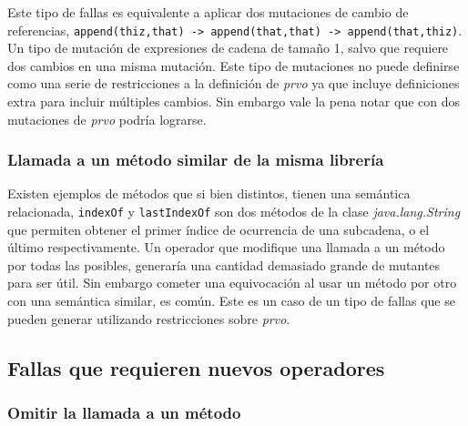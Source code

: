 Este tipo de fallas es equivalente a aplicar dos mutaciones de cambio de referencias, \lstinline|append(thiz,that) -> append(that,that) -> append(that,thiz)|. Un tipo de mutaci\'on de expresiones de cadena de tama\~no 1, salvo que requiere dos cambios en una misma mutaci\'on. Este tipo de mutaciones no puede definirse como una serie de restricciones a la definici\'on de \emph{prvo} ya que incluye definiciones extra para incluir m\'ultiples cambios. Sin embargo vale la pena notar que con dos mutaciones de \emph{prvo} podr\'ia lograrse.

\subsubsection{Llamada a un m\'etodo similar de la misma librer\'ia}

Existen ejemplos de m\'etodos que si bien distintos, tienen una sem\'antica relacionada, \texttt{indexOf} y \texttt{lastIndexOf} son dos m\'etodos de la clase \emph{java.lang.String} que permiten obtener el primer \'indice de ocurrencia de una subcadena, o el \'ultimo respectivamente. Un operador que modifique una llamada a un m\'etodo por todas las posibles, generar\'ia una cantidad demasiado grande de mutantes para ser \'util. Sin embargo cometer una equivocaci\'on al usar un m\'etodo por otro con una sem\'antica similar, es com\'un. Este es un caso de un tipo de fallas que se pueden generar utilizando restricciones sobre \emph{prvo}.

\subsection{Fallas que requieren nuevos operadores}

\subsubsection{Omitir la llamada a un m\'etodo}

